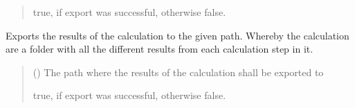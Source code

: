 \documentclass[letterpaper,10pt,english]{sphinxmanual}
\begin{document}
\begin{fulllineitems}
\begin{fulllineitems}
\begin{quote}
\begin{description}
\sphinxAtStartPar
true, if export was successful, otherwise false.

\sphinxAtStartPar
{}

\end{description}\end{quote}

\end{fulllineitems}


\begin{fulllineitems}
\label{\detokenize{apidoc/src.osm_configurator.model.application:src.osm_configurator.model.application.application.Application.export_calculation}}
\pysigstartsignatures
{}
\pysigstopsignatures
\sphinxAtStartPar
Exports the results of the calculation to the given path.
Whereby the calculation are a folder with all the different results from each
calculation step in it.
\begin{quote}\begin{description}
\sphinxAtStartPar
{} () \textendash{} The path where the results of the calculation shall be exported to

\sphinxAtStartPar
true, if export was successful, otherwise false.

\sphinxAtStartPar
{}

\end{description}\end{quote}

\end{fulllineitems}



\end{fulllineitems}
\end{document}
